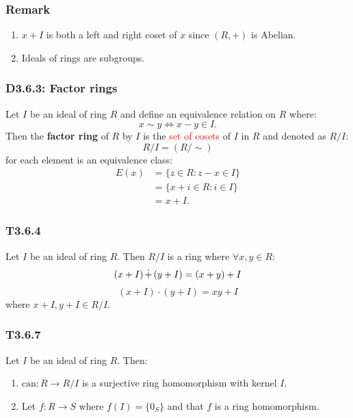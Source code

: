 \documentclass{article}
\begin{document}
\begin{multicols*}{3}
\subsubsection*{Remark}
\begin{enumerate}
    \item $x+I$ is both a left and right coset of $x$
    since $(R,+)$ is Abelian.

    \item Ideals of rings are subgroups.
\end{enumerate}

\subsubsection*{D3.6.3: Factor rings}
Let $I$ be an ideal of ring $R$ and define an
equivalence relation on $R$ where:
$$x\sim y\iff x-y\in I.$$
Then the \textbf{factor ring} of $R$ by $I$ is the
\textcolor{red}{set of cosets} of $I$ in $R$
and denoted as $R/I$:
$$R/I=(R/\sim)$$
for each element is an equivalence class:
\begin{align*}
    E(x)
    &=\{z\in R:z-x\in I\} \\
    &=\{x+i\in R:i\in I\} \\
    &=x+I.
\end{align*}

\subsubsection*{T3.6.4}
Let $I$ be an ideal of ring $R$. Then $R/I$
is a ring where $\forall x,y\in R$:
$$(x+I)\hspace{0.02in}\dot{+}\hspace{0.02in}
(y+I)=(x+y)+I$$
$$(x+I)\cdot(y+I)=xy+I$$
where $x+I,y+I\in R/I$.

\subsubsection*{T3.6.7}
Let $I$ be an ideal of ring $R$. Then:
\begin{enumerate}
    \item $\text{can}:R\rightarrow R/I$ is a surjective
    ring homomorphism with kernel $I$.

    \item Let $f:R\rightarrow S$ where $f(I)=\{0_S\}$ and
    that $f$ is a ring homomorphism.
    

\end{enumerate}
\end{multicols*}
\end{document}
